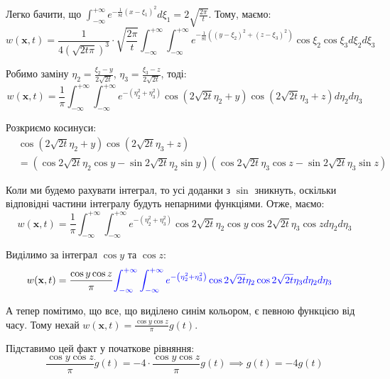 \documentclass{hw_template}
\begin{document}
Легко бачити, що
$\int_{-\infty}^{+\infty}e^{-\frac{1}{8t}(x-\xi_1)^2}d\xi_1=2\sqrt{\frac{2\pi}{t}}$. Тому, маємо:
\begin{equation*}
    w(\mathbf{x},t) = \frac{1}{4(\sqrt{2t\pi})^3} \cdot \sqrt{\frac{2\pi}{t}}\int_{-\infty}^{+\infty}\int_{-\infty}^{+\infty}e^{-\frac{1}{8t}\left((y-\xi_2)^2+(z-\xi_3)^2\right)}\cos\xi_2 \cos\xi_3 d\xi_2 d\xi_3
\end{equation*}

Робимо заміну $\eta_2 = \frac{\xi_2-y}{2\sqrt{2t}}$, $\eta_3 = \frac{\xi_3-z}{2\sqrt{2t}}$, тоді:
\begin{equation*}
    w(\mathbf{x},t) = \frac{1}{\pi}\int_{-\infty}^{+\infty}\int_{-\infty}^{+\infty}e^{-\left(\eta_2^2+\eta_3^2\right)}\cos(2\sqrt{2t}\eta_2 + y)\cos(2\sqrt{2t}\eta_3 + z)d\eta_2 d\eta_3
\end{equation*}

Розкриємо косинуси:
\begin{align*}
    &\cos (2\sqrt{2t}\eta_2 + y)\cos(2\sqrt{2t}\eta_3 + z) \\
    &= (\cos 2\sqrt{2t}\eta_2 \cos y - \sin 2\sqrt{2t}\eta_2 \sin y)(\cos 2\sqrt{2t}\eta_3 \cos z - \sin 2\sqrt{2t}\eta_3 \sin z)
\end{align*}

Коли ми будемо рахувати інтеграл, то усі доданки з $\sin$ зникнуть, оскільки
відповідні частини інтегралу будуть непарними функціями. Отже, маємо:
\begin{equation*}
    w(\mathbf{x},t) = \frac{1}{\pi}\int_{-\infty}^{+\infty}\int_{-\infty}^{+\infty}e^{-\left(\eta_2^2+\eta_3^2\right)}\cos 2\sqrt{2t}\eta_2 \cos y\cos 2\sqrt{2t}\eta_3 \cos zd\eta_2 d\eta_3
\end{equation*}

Виділимо за інтеграл $\cos y$ та $\cos z$:
\begin{align*}
    w(\mathbf{x},t) &= \frac{\cos y \cos z}{\pi}\textcolor{blue}{\int_{-\infty}^{+\infty}\int_{-\infty}^{+\infty}e^{-\left(\eta_2^2+\eta_3^2\right)}\cos 2\sqrt{2t}\eta_2 \cos 2\sqrt{2t}\eta_3 d\eta_2 d\eta_3}
\end{align*}

А тепер помітимо, що все, що виділено синім кольором, є певною функцією від
часу. Тому нехай $w(\mathbf{x},t) = \frac{\cos y \cos z}{\pi}g(t)$.

Підставимо цей факт у початкове рівняння:
\begin{equation*}
    \frac{\cos y \cos z}{\pi}\dot{g}(t) = -4 \cdot \frac{\cos y \cos z}{\pi}g(t) \implies g(t) = -4g(t)
\end{equation*}
\end{document}
